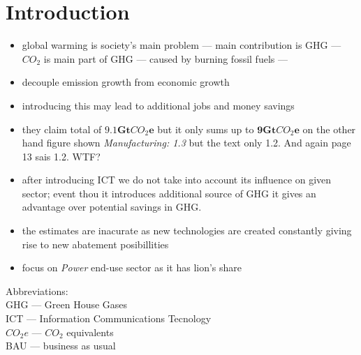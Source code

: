 \documentclass[11pt, twocolumn]{article}
\begin{document}
\section{Introduction}
\begin{itemize}
\item global warming is society's main problem --- main contribution is GHG --- $CO_2$ is main part of GHG --- caused by burning fossil fuels ---

\item decouple emission growth from economic growth

\item introducing this may lead to additional jobs and money savings

\item they claim total of $\mathbf{9.1} \mathbf{Gt}CO_2\mathbf{e}$ but it only sums up to $\mathbf{9} \mathbf{Gt}CO_2\mathbf{e}$ on the other hand figure shown \emph{Manufacturing: 1.3} but the text only 1.2. And again page 13 sais 1.2. WTF?

\item after introducing ICT we do not take into account its influence on given sector; event thou it introduces additional source of GHG it gives an advantage over potential savings in GHG.

\item the estimates are inacurate as new technologies are created constantly giving rise to new abatement posibillities

\item focus on \emph{Power} end-use sector as it has lion's share
\end{itemize}

{\small
Abbreviations:\\
GHG --- Green House Gases\\
ICT --- Information Communications Tecnology\\
$CO_2e$ --- $CO_2$ equivalents\\
BAU --- business as usual
}
\end{document}
